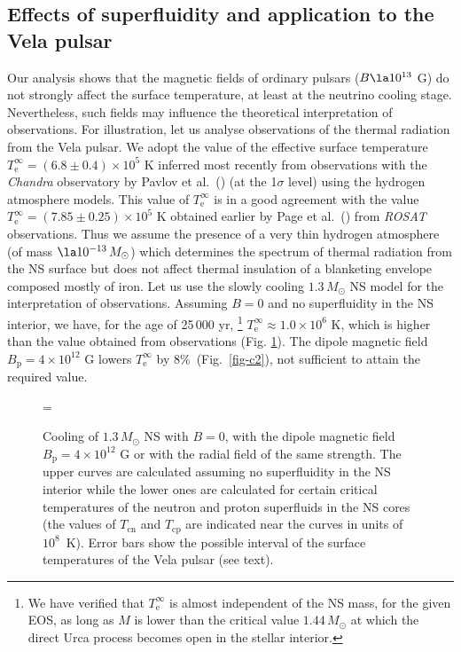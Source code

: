 \documentclass{aa}
\begin{document}
\subsection{Effects of superfluidity 
and application to the Vela pulsar}
% 
%
Our analysis shows that
the magnetic fields of ordinary pulsars
($B \la 10^{13}$ G) do not strongly affect the
surface temperature, at least at the neutrino
cooling stage. Nevertheless, such fields may influence 
the theoretical
interpretation of observations. For illustration,
let us analyse observations of the thermal radiation
from the Vela pulsar. We adopt the value of
the effective surface temperature
$T_\mathrm{e}^\infty=  (6.8 \pm 0.4) \times 10^5$ K
inferred most recently 
from observations with the \emph{Chandra} observatory 
by Pavlov et al.\ (\cite{Vela-GG})
(at the 1$\sigma$ level)
using the hydrogen atmosphere models.
This value of $T_\mathrm{e}^\infty$
is in a good agreement with the
value $T_\mathrm{e}^\infty=  (7.85 \pm 0.25) \times 10^5$ K
obtained earlier by Page et al.\ (\cite{pageetal96})
from \emph{ROSAT} observations. 
Thus we assume the presence of a very thin
hydrogen atmosphere (of mass $\la 10^{-13} \, M_\odot$)
which determines the spectrum of thermal radiation
from the NS surface but does not affect thermal
insulation of a blanketing envelope composed
mostly of iron. Let us use the slowly cooling
$1.3 \, M_\odot$ NS model for the interpretation
of observations. Assuming 
$B=0$ and no superfluidity in the NS interior,
we have, for the age of 25\,000 yr,%
%
%
\footnote{We have verified that $T_\mathrm{e}^\infty$
is almost independent of the NS mass, for the given EOS, 
as long as $M$ is lower than
the critical value $1.44 \, M_\odot$ at which the direct
Urca process becomes open in the stellar interior.}
%
%
$T_\mathrm{e}^\infty\approx1.0\times10^6$ K,
which is higher than the value
obtained from observations (Fig. \ref{fig-c4}).
The dipole magnetic field $B_\mathrm{p} = 4 \times 10^{12}$ G
lowers $T_\mathrm{e}^\infty$
by 8\%\ (Fig.\ \ref{fig-c2}), not sufficient to attain
the required value.

\begin{figure}
\centering
\epsfxsize=\hsize
{}
\caption{Cooling of $1.3 \, M_\odot$ NS
   with $B=0$, with the dipole
   magnetic field  $B_\mathrm{p}= 4 \times 10^{12}$ G
   or with the radial field of the same strength.
   The upper curves are calculated assuming
   no superfluidity in the NS interior
   while the lower ones are calculated
   for certain critical temperatures of the neutron and
   proton superfluids in the NS cores
   (the values of $T_\mathrm{cn}$ and $T_\mathrm{cp}$
   are indicated near the curves in units of $10^8$~K).
   Error bars show the possible interval of the surface
   temperatures of the Vela pulsar (see text).
}
\label{fig-c4}
\end{figure}
\end{document}
